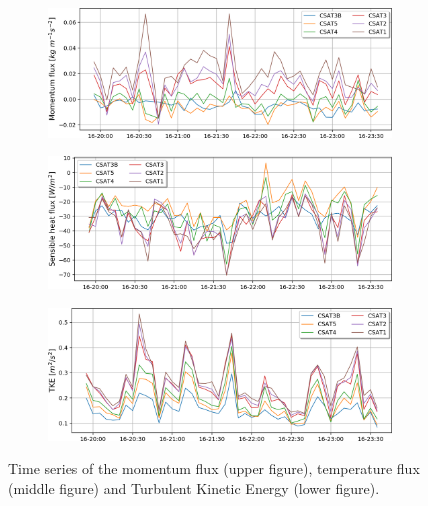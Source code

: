\begin{figure}[!ht]
    \centering
    \begin{subfigure}[b]{0.6\textwidth}
        \includegraphics[width=\textwidth]{fig/chapter_4/16-17/Tau_16-17.png}
      \label{fig:Tau_16-17}
    \end{subfigure}
    \begin{subfigure}[b]{0.6\textwidth}
        \includegraphics[width=\textwidth]{fig/chapter_4/16-17/H_16-17.png}
        \label{fig:H_16-17}
    \end{subfigure}
    \begin{subfigure}[b]{0.6\textwidth}
        \includegraphics[width=\textwidth]{fig/chapter_4/16-17/TKE_16-17.png}
        \label{fig:TKE_16-17}
    \end{subfigure}
    \caption{Time series of the momentum flux (upper figure), temperature flux (middle figure) and Turbulent Kinetic Energy (lower figure). }
    \label{fig:16-17_flux_series}
\end{figure}
